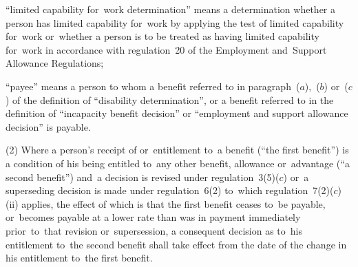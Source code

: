 \documentclass[12pt,a4paper]{article}
\begin{document}
\begin{enumerate}
“limited capability for~work determination” means a determination whether a person has limited capability for~work by applying the test of limited capability for~work or~whether a person is to be treated as having limited capability for~work in accordance with regulation~20 of the Employment and~Support Allowance Regulations;

\begin{sloppypar}
“payee” means a person to whom a benefit referred to in paragraph~($a$),~($b$) or~($c$) of the definition of “disability determination”, or a benefit referred to in the definition of “incapacity benefit decision” 
or “employment and support allowance decision”  %
is payable.
\end{sloppypar}
\end{enumerate}

(2) Where a person’s receipt of or~entitlement to~a benefit (“the first benefit”) is a condition of his being entitled to~any other benefit, allowance or~advantage (“a second benefit”) and~a decision is revised under regulation~3(5)($c$) or~a superseding decision is made under regulation~6(2) to~which regulation~7(2)($c$)(ii) applies, the effect of which is that the first benefit ceases to~be payable, or~becomes payable at a lower rate than was in payment immediately prior~to~that revision or~supersession, a consequent decision as to~his entitlement to~the second benefit shall take effect from the date of the change in his entitlement to~the first benefit.

\end{document}
